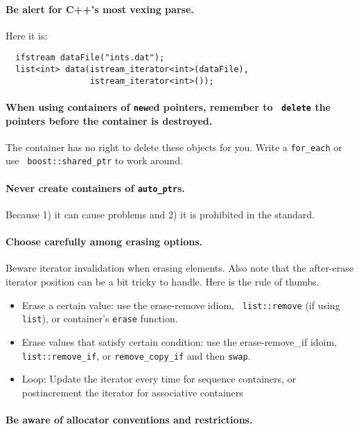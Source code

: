 \documentclass{article}
\begin{document}
\paragraph{Be alert for C++'s most vexing parse.}  Here it is:
\begin{verbatim}
  ifstream dataFile("ints.dat");
  list<int> data(istream_iterator<int>(dataFile),
                 istream_iterator<int>());
\end{verbatim}

\paragraph{When using containers of {\tt new}ed pointers, remember to {\tt
delete} the pointers before the container is destroyed.}  The container has no
right to delete these objects for you.  Write a {\tt for\_each} or use {\tt
boost::shared\_ptr} to work around.

\paragraph{Never create containers of {\tt auto\_ptr}s.}  Because 1) it can
cause problems and 2) it is prohibited in the standard.

\paragraph{Choose carefully among erasing options.} Beware iterator
invalidation when erasing elements.  Also note that the after-erase iterator
position can be a bit tricky to handle.  Here is the rule of thumbs.

\begin{itemize} \item Erase a certain value: use the erase-remove idiom, {\tt
list::remove} (if using {\tt list}), or container's {\tt erase} function.
\item Erase values that satisfy certain condition: use the erase-remove\_if idoim, {\tt
list::remove\_if}, or {\tt remove\_copy\_if} and then {\tt swap}.  \item Loop:
Update the iterator every time for sequence containers, or postincrement the
iterator for associative containers \end{itemize}

\paragraph{Be aware of allocator conventions and restrictions.}
\end{document}
